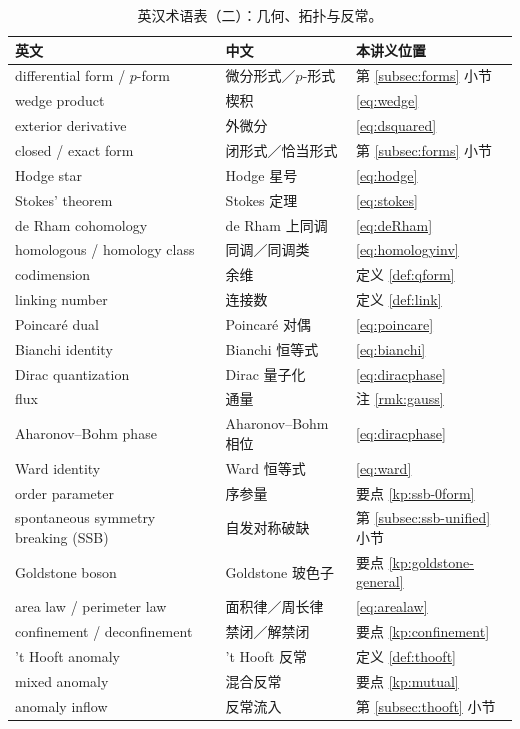 \documentclass[UTF8,a4paper,11pt]{ctexart}
\theoremstyle{plain}
\theoremstyle{definition}
\theoremstyle{remark}
\begin{document}
\begin{table}[htbp]
\centering
\caption{英汉术语表（二）：几何、拓扑与反常。}
\label{tab:glossary2}
\begin{tabular}{@{}lll@{}}
\toprule
英文 & 中文 & 本讲义位置 \\
\midrule
differential form / $p$-form & 微分形式／$p$-形式
  & 第 \ref{subsec:forms} 小节 \\
wedge product & 楔积 & \eqref{eq:wedge} \\
exterior derivative & 外微分 & \eqref{eq:dsquared} \\
closed / exact form & 闭形式／恰当形式 & 第 \ref{subsec:forms} 小节 \\
Hodge star & Hodge 星号 & \eqref{eq:hodge} \\
Stokes' theorem & Stokes 定理 & \eqref{eq:stokes} \\
de Rham cohomology & de Rham 上同调 & \eqref{eq:deRham} \\
homologous / homology class & 同调／同调类 & \eqref{eq:homologyinv} \\
codimension & 余维 & 定义 \ref{def:qform} \\
linking number & 连接数 & 定义 \ref{def:link} \\
Poincaré dual & Poincaré 对偶 & \eqref{eq:poincare} \\
Bianchi identity & Bianchi 恒等式 & \eqref{eq:bianchi} \\
Dirac quantization & Dirac 量子化 & \eqref{eq:diracphase} \\
flux & 通量 & 注 \ref{rmk:gauss} \\
Aharonov--Bohm phase & Aharonov--Bohm 相位 & \eqref{eq:diracphase} \\
Ward identity & Ward 恒等式 & \eqref{eq:ward} \\
order parameter & 序参量 & 要点 \ref{kp:ssb-0form} \\
spontaneous symmetry breaking (SSB) & 自发对称破缺
  & 第 \ref{subsec:ssb-unified} 小节 \\
Goldstone boson & Goldstone 玻色子 & 要点 \ref{kp:goldstone-general} \\
area law / perimeter law & 面积律／周长律 & \eqref{eq:arealaw} \\
confinement / deconfinement & 禁闭／解禁闭 & 要点 \ref{kp:confinement} \\
't Hooft anomaly & 't Hooft 反常 & 定义 \ref{def:thooft} \\
mixed anomaly & 混合反常 & 要点 \ref{kp:mutual} \\
anomaly inflow & 反常流入 & 第 \ref{subsec:thooft} 小节 \\

\end{tabular}
\end{table}
\end{document}
